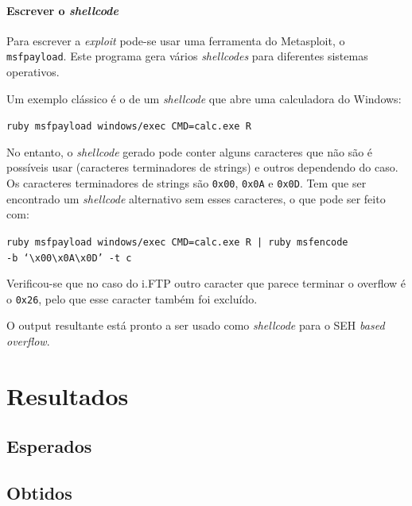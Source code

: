 \documentclass[a4paper]{article}
\begin{document}
\paragraph*{Escrever o \textit{shellcode}} Para escrever a \textit{exploit} pode-se usar uma ferramenta do Metasploit, o \texttt{msfpayload}. Este programa gera vários \textit{shellcodes} para diferentes sistemas operativos.

Um exemplo clássico é o de um \textit{shellcode} que abre uma calculadora do Windows:

	\texttt{ruby msfpayload windows/exec CMD=calc.exe R}

No entanto, o \textit{shellcode} gerado pode conter alguns caracteres que não são é possíveis usar (caracteres terminadores de strings) e outros dependendo do caso. Os caracteres terminadores de strings são \texttt{0x00}, \texttt{0x0A} e \texttt{0x0D}. Tem que ser encontrado um \textit{shellcode} alternativo sem esses caracteres, o que pode ser feito com:

	\texttt{ruby msfpayload windows/exec CMD=calc.exe R | ruby msfencode \\ -b `\textbackslash x00\textbackslash x0A\textbackslash x0D' -t c}

Verificou-se que no caso do i.FTP outro caracter que parece terminar o overflow é o \texttt{0x26}, pelo que esse caracter também foi excluído.

O output resultante está pronto a ser usado como \textit{shellcode} para o SEH \textit{based overflow}.


\pagebreak
\section{Resultados}

\subsection{Esperados}
\subsection{Obtidos}


\pagebreak

\nocite{CorelanTeam, refx86asm, genSEHexploits, AMD64vol3_2013}
\end{document}
